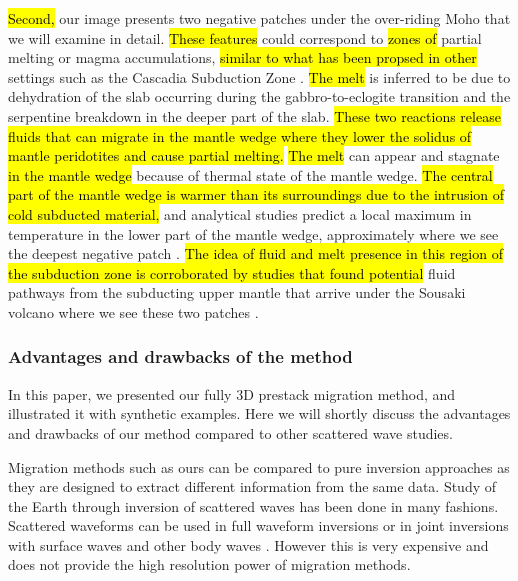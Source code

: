\documentclass[10pt,a4paper]{article}
\begin{document}
\hl{Second,} our image presents two negative patches under the over-riding Moho that we will examine in detail.
\hl{These features} could correspond to \hl{zones of} partial melting or magma accumulations, \hl{similar to what has been propsed in other} settings such as the Cascadia Subduction Zone \citep{mcga_nat_14,wann_ggg_14}.
\hl{The melt} is inferred to be due to dehydration of the slab occurring during the gabbro-to-eclogite transition and the serpentine breakdown in the deeper part of the slab.
\hl{These two reactions release fluids that can migrate in the mantle wedge where they lower the solidus of mantle peridotites and cause partial melting.}
\hl{The melt} can appear and stagnate \hl{in the mantle wedge} because of thermal state of the mantle wedge.
\hl{The central part of the mantle wedge is warmer than its surroundings due to the intrusion of cold subducted material,} and analytical studies predict a local maximum in temperature in the lower part of the mantle wedge, approximately where we see the deepest negative patch \citep{mcga_nat_14}.
\hl{The idea of fluid and melt presence in this region of the subduction zone is corroborated by studies that found potential} fluid pathways from the subducting upper mantle that arrive under the Sousaki volcano where we see these two patches \citep{gala_tphy_05}.

\subsubsection{Advantages and drawbacks of the method}

In this paper, we presented our fully 3D prestack migration method, and illustrated it with synthetic examples.
Here we will shortly discuss the advantages and drawbacks of our method compared to other scattered wave studies.

Migration methods such as ours can be compared to pure inversion approaches as they are designed to extract different information from the same data.
Study of the Earth through inversion of scattered waves has been done in many fashions.
Scattered waveforms can be used in full waveform inversions \citep[P-wave coda waveform inversion,][]{fred_gji_04} or in joint inversions with surface waves and other body waves \citep[e.g.,][]{bodi_gji_16}.
However this is very expensive and does not provide the high resolution power of migration methods.
\end{document}
